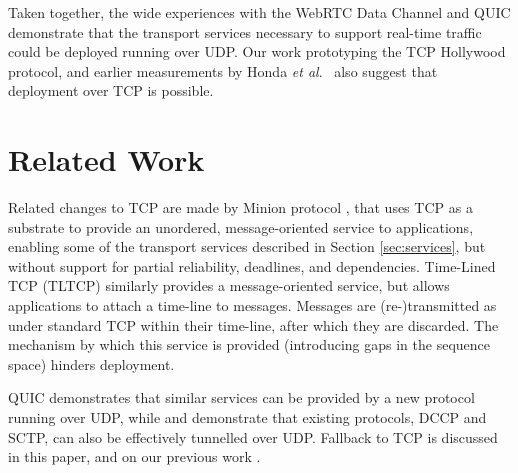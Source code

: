 \documentclass[10pt]{sig-alternate-05-2015}
\begin{document}
Taken together, the wide experiences with the WebRTC Data Channel and QUIC
demonstrate that the transport services necessary to support real-time
traffic could be deployed running over UDP. Our work prototyping the TCP
Hollywood protocol, and earlier measurements by Honda \emph{et al}.\
\cite{honda:2011:extend-tcp} also suggest that deployment over TCP is
possible.

\section{Related Work}
\label{sec:related}

%
%

Related changes to TCP are made by Minion protocol \cite{nowlan:2012:minion},
that uses TCP as a substrate to provide an unordered, message-oriented
service to applications, enabling some of the transport services described
in Section \ref{sec:services}, but without support for partial reliability,
deadlines, and dependencies.
Time-Lined TCP (TLTCP) \cite{mukherjee:2000:timelines} similarly provides a
message-oriented service, but allows applications to attach a time-line
to messages. Messages are (re-)transmitted as under standard TCP within
their time-line, after which they are discarded. The mechanism by which
this service is provided (introducing gaps in the sequence space) hinders
deployment.

QUIC \cite{draft-tsvwg-quic-protocol-02} demonstrates that similar services
can be provided by a new protocol running over UDP, while \cite{RFC6773} and
\cite{draft-ietf-rtcweb-data-channel-13} demonstrate that existing protocols,
DCCP and SCTP, can also be effectively tunnelled over UDP. Fallback to TCP
is discussed in this paper, and on our previous work \cite{mcquistin2016tcp}.
\end{document}
